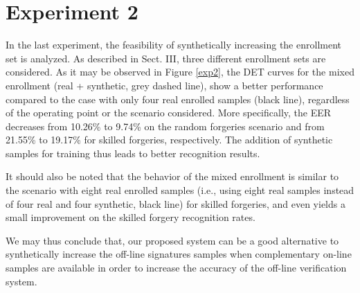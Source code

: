 \section{Experiment 2}
In the last experiment, the feasibility of synthetically
increasing the enrollment set is analyzed. As described in
Sect. III, three different enrollment sets are considered. As it
may be observed in Figure \ref{exp2}, the DET curves for the
mixed enrollment (real + synthetic, grey dashed line), show a
better performance compared to the case with only four real
enrolled samples (black line), regardless of the operating point or the scenario considered. More specifically, the EER decreases from 10.26\% to 9.74\% on the random forgeries scenario and from 21.55\% to 19.17\% for skilled forgeries, respectively. The addition of synthetic samples for training thus leads to better recognition results.


It should also be noted that the behavior of the mixed enrollment is similar to the scenario with eight real enrolled samples (i.e., using eight real samples instead of
four real and four synthetic, black line) for skilled forgeries, and even yields a small improvement on the skilled forgery recognition rates. 

We may thus conclude that, our proposed system can be a good alternative to synthetically increase the off-line signatures samples when complementary on-line samples are available in order to increase the accuracy of the off-line verification system.